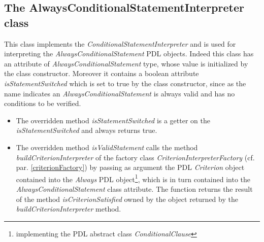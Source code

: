 \documentclass[a4paper,11pt] {ivoa}
\begin{document}
\subsection{The AlwaysConditionalStatementInterpreter class}
This class implements the {\it ConditionalStatementInterpreter} and is used for interpreting the {\it AlwaysConditionalStatement} PDL objects. Indeed this class has an attribute of {\it AlwaysConditionalStatement} type, whose value is initialized by the class constructor. Moreover it contains a boolean attribute {\it isStatementSwitched} which is set to true by the class constructor, since as the name indicates an {\it AlwaysConditionalStatement} is always valid and has no conditions to be verified.\\
\begin{itemize}
\item The overridden method {\it isStatementSwitched} is a getter on the  {\it isStatementSwitched} and always returns true.
\item The overridden method {\it isValidStatement} calls the method {\it buildCriterionInterpreter} of the factory class {\it CriterionInterpreterFactory} (cf. par. \ref{criterionFactory}) by passing as argument the PDL {\it Criterion} object contained into the {\it Always} PDL object\footnote{implementing the PDL abstract class {\it ConditionalClause}}, which is in turn contained into the {\it AlwaysConditionalStatement} class attribute. The function returns the result of the method {\it isCriterionSatisfied} owned by the object returned by the {\it buildCriterionInterpreter} method.
\end{itemize}
\end{document}
